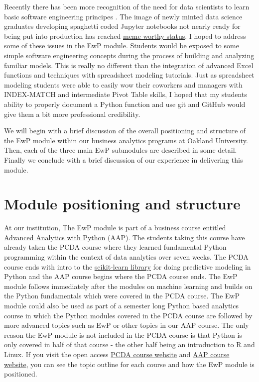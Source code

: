 \documentclass[ited,blindrev]{informs3}              %
\begin{document}
Recently there has been more recognition of the need for data scientists to learn basic software engineering principes \citep{nelsonSoftwareEngineeringData2024,treadwaySoftwareEngineeringData2023,rodriguesBuildingReproducibleAnalytical2023}.  The image of newly minted data science graduates developing spaghetti coded Jupyter notebooks not nearly ready for being put into production has reached \href{https://www.reddit.com/r/ProgrammerHumor/comments/y2xe3n/like_every_time_ever_when_the_devops_engineer/}{meme worthy status}. I hoped to address some of these issues in the EwP module. Students would be exposed to some simple software engineering concepts during the process of building and analyzing familiar models. This is really no different than the integration of advanced Excel functions and techniques with spreadsheet modeling tutorials. Just as spreadsheet modeling students were able to easily wow their coworkers and managers with INDEX-MATCH and intermediate Pivot Table skills, I hoped that my students ability to properly document a Python function and use git and GitHub would give them a bit more professional credibility.

We will begin with a brief discussion of the overall positioning and structure of the EwP module within our business analytics programs at Oakland University. Then, each of the three main EwP submodules are described in some detail. Finally we conclude with a brief discussion of our experience in delivering this module.

\section{Module positioning and structure}

At our institution, The EwP module is part of a business course entitled  \href{http://www.sba.oakland.edu/faculty/isken/courses/aap}{Advanced Analytics with Python} (AAP). The students taking this course have already taken the PCDA course where they learned fundamental Python programming within the context of data analytics over seven weeks. The PCDA course ends with intro to the \href{https://scikit-learn.org/stable/index.html}{scikit-learn library} for doing predictive modeling in Python and the AAP course begins where the PCDA course ends. The EwP module follows immediately after the modules on machine learning and builds on the Python fundamentals which were covered in the PCDA course. The EwP module could also be used as part of a semester long Python based analytics course in which the Python modules covered in the PCDA course are followed by more advanced topics such as EwP or other topics in our AAP course. The only reason the EwP module is not included in the PCDA course is that Python is only covered in half of that course - the other half being an introduction to R and Linux. If you visit the open access \href{http://www.sba.oakland.edu/faculty/isken/courses/pcda/}{PCDA course website}  and \href{http://www.sba.oakland.edu/faculty/isken/courses/aap/}{AAP course website}, you can see the topic outline for each course and how the EwP module is positioned. 
\end{document}
